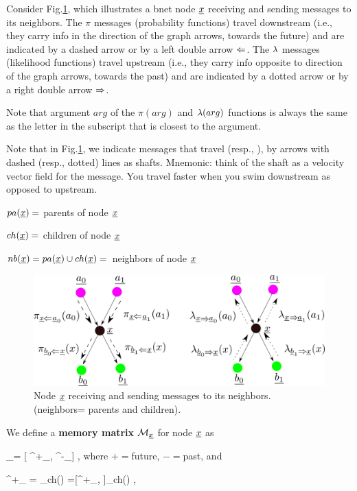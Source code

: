 Consider Fig.\ref{fig-pi-lam},
which illustrates
a bnet node $\rvx$ receiving and sending
messages to its neighbors.
The $\pi$  messages
(probability functions)
travel downstream (i.e., 
they carry info
in the direction
of the graph arrows, towards the future)
and are indicated by a dashed arrow
or by a left double arrow $\Leftarrow$. 
The $\lambda$  messages 
(likelihood functions) travel 
upstream (i.e., they 
carry info opposite to 
direction of the graph arrows,
towards the past)
and are indicated
by a dotted arrow
or by a right double arrow $\Rightarrow$.

Note that argument $arg$ of the $\pi(arg)$
and $\lambda(arg)$
functions is always the same
as the letter in the subscript
that is closest to the argument.

Note that in Fig.\ref{fig-pi-lam},
we indicate
messages that travel
(resp., ), by
arrows with dashed (resp., dotted)
 lines as shafts.
Mnemonic: think of the shaft as a
 velocity vector field
for the message.
You travel faster when
you swim downstream as opposed
to upstream.

$pa(\rvx)=$ parents of node $\rvx$

$ch(\rvx)=$ children of node $\rvx$

$nb(\rvx)=pa(\rvx)\cup ch(\rvx)=$
neighbors of node $\rvx$



\begin{figure}[h!]
\centering
\includegraphics[width=6in]{mpass/pi-lam.png}
\caption{Node $\rvx$ receiving
and sending messages to
 its neighbors. (neighbors=
parents and children).
}
\label{fig-pi-lam}
\end{figure}


We define a {\bf memory matrix}
$\calm_{\rvx}$ for node $\rvx$
as

\beq
\calm_{\rvx}=
[
\calm^+_{\rvx},
\calm^-_{\rvx}]
\;,
\eeq
where $+=$future, $-=$past, and 

\beq
\calm^+_{ \rvx}=
_{\rvb\in ch(\rvx)}
=[\calm^+_{\rvb, \rvx}]_{\rvb\in ch(\rvx)}
\;,
\eeq


